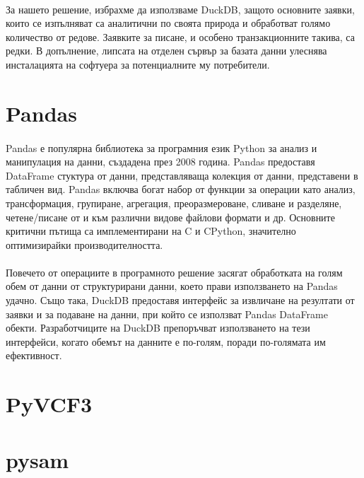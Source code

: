 \documentclass[pdftex,cyrillic,14pt,a4page,twoside]{extreport}
\begin{document}
\paragraph{}
За нашето решение, избрахме да използваме DuckDB, защото основните заявки, които се изпълняват са аналитични по своята природа и обработват голямо количество от редове. Заявките за писане, и особено транзакционните такива, са редки. В допълнение, липсата на отделен сървър за базата данни улеснява инсталацията на софтуера за потенциалните му потребители.
\section{Pandas}
\paragraph{}
Pandas \cite{reback2020pandas} е популярна библиотека за програмния език Python за анализ и манипулация на данни, създадена през 2008 година. Pandas предоставя DataFrame стуктура от данни, представляваща колекция от данни, представени в табличен вид. Pandas включва богат набор от функции за операции като анализ, трансформация, групиране, агрегация, преоразмероване, сливане и разделяне, четене/писане от и към различни видове файлови формати и др. Основните критични пътища са имплементирани на C и CPython, значително оптимизирайки производителността.

\paragraph{}
Повечето от операциите в програмното решение засягат обработката на голям обем от данни от структурирани данни, което прави използването на Pandas удачно. Също така, DuckDB предоставя интерфейс за извличане на резултати от заявки и за подаване на данни, при който се използват Pandas DataFrame обекти. Разработчиците на DuckDB препоръчват използването на тези интерфейси, когато обемът на данните е по-голям, поради по-голямата им ефективност.
\section{PyVCF3}
\paragraph{}
\section{pysam}
\end{document}
